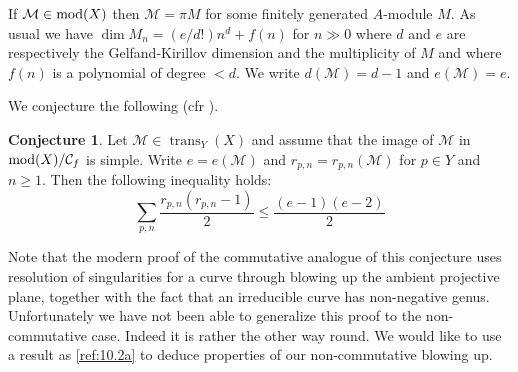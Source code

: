 \documentclass{amsproc}
\def\Cscr{{\mathcal C}}
\def\Mscr{{\mathcal M}}
\def\mod{\mathop{\text{mod}}}
\def\trans{\operatorname{trans}}
\let\oldtext\text
\def\text#1{\oldtext{\upshape #1}}
\theoremstyle{definition}
\newtheorem{conjectures}[lemmas]{Conjecture}
\theoremstyle{remark}
\numberwithin{equation}{section}
\numberwithin{table}{section}
\numberwithin{figure}{section}
\begin{document}
If $\Mscr\in \mod(X)$ then $\Mscr=\pi M$ for some finitely generated
$A$-module $M$. As usual \cite{ATV2} we have $\dim M_n=(e/d!)n^d+f(n)$ for
$n\gg 0$ where $d$ and $e$ are respectively the Gelfand-Kirillov
dimension and the multiplicity of $M$ and where $f(n)$ is a polynomial
of degree $<d$. We write
$d(\Mscr)=d-1$ and $e(\Mscr)=e$.

We conjecture the following (cfr \cite[Cor 3.7]{H}).
\begin{conjectures}
 Let $\Mscr\in \trans_Y(X)$ and assume that the
  image of $\Mscr$ in $\mod(X)/\Cscr_f$ is simple. Write $e=e(\Mscr)$ and
  $r_{p,n}=r_{p,n}(\Mscr)$ for $p\in Y$ and $n\ge 1$. Then the
  following inequality holds:
\begin{equation}
\label{ref:10.2a}
\sum_{p,n}
\frac{r_{p,n}(r_{p,n}-1)}{2}\le
\frac{(e-1)(e-2)}{2}
\end{equation}
\end{conjectures}
Note that the modern proof of the commutative analogue of this
conjecture 
uses resolution of singularities for a curve through blowing up the
ambient projective plane, together with the fact that an irreducible curve has
non-negative genus. Unfortunately we have not been able to generalize this
proof to the non-commutative case. Indeed it is rather the other way
round. We would like to use a result as \eqref{ref:10.2a} to
deduce properties of our non-commutative blowing up.
\end{document}

